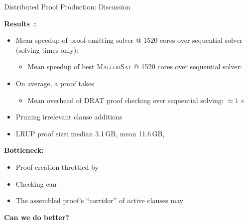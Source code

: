 \documentclass[t,english]{sdqbeamer}
\begin{document}
\begin{frame}{Distributed Proof Production: Discussion}

\textbf{Results~\cite{michaelson2025producing}:}\quad\quad {}
\\[2mm]
\begin{itemize}
	\item Mean speedup of proof-emitting solver @ 1520 cores over sequential solver (solving times only): 
	\begin{itemize}
		\item Mean speedup of best \textsc{MallobSat} @ 1520 cores over sequential solver: 
	\end{itemize}
	\item On average,  a proof takes 
	\begin{itemize}
		\item Mean overhead of DRAT proof checking over sequential solving: $\approx 1\times$
	\end{itemize}
	\item Pruning irrelevant clause additions 
	\item LRUP proof size: median 3.1\,GB, mean 11.6\,GB, 
\end{itemize}

\vspace*{2mm}
\textbf{Bottleneck:} \pause {}
\begin{itemize}
	\item Proof creation throttled by 
	\item Checking can 
	\item The assembled proof's ``corridor'' of active clauses may 
\end{itemize}

\vspace*{2mm}	
\textbf{Can we do better?}
\end{frame}
\end{document}

